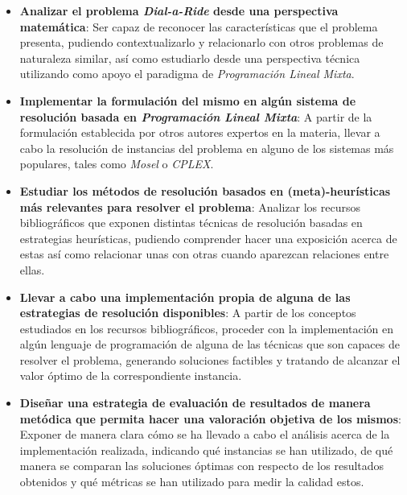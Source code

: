 \documentclass{subfiles}
\begin{document}
      \begin{itemize}

        \item \textbf{Analizar el problema \emph{Dial-a-Ride} desde una perspectiva matemática}: Ser capaz de reconocer las características que el problema presenta, pudiendo contextualizarlo y relacionarlo con otros problemas de naturaleza similar, así como estudiarlo desde una perspectiva técnica utilizando como apoyo el paradigma de \emph{Programación Lineal Mixta}.

        \item \textbf{Implementar la formulación del mismo en algún sistema de resolución basada en \emph{Programación Lineal Mixta}}: A partir de la formulación establecida por otros autores expertos en la materia, llevar a cabo la resolución de instancias del problema en alguno de los sistemas más populares, tales como \emph{Mosel} o \emph{CPLEX}.

        \item \textbf{Estudiar los métodos de resolución basados en (meta)-heurísticas más relevantes para resolver el problema}: Analizar los recursos bibliográficos que exponen distintas técnicas de resolución basadas en estrategias heurísticas, pudiendo comprender hacer una exposición acerca de estas así como relacionar unas con otras cuando aparezcan relaciones entre ellas.

        \item \textbf{Llevar a cabo una implementación propia de alguna de las estrategias de resolución disponibles}: A partir de los conceptos estudiados en los recursos bibliográficos, proceder con la implementación en algún lenguaje de programación de alguna de las técnicas que son capaces de resolver el problema, generando soluciones factibles y tratando de alcanzar el valor óptimo de la correspondiente instancia.

        \item \textbf{Diseñar una estrategia de evaluación de resultados de manera metódica que permita hacer una valoración objetiva de los mismos}: Exponer de manera clara cómo se ha llevado a cabo el análisis acerca de la implementación realizada, indicando qué instancias se han utilizado, de qué manera se comparan las soluciones óptimas con respecto de los resultados obtenidos y qué métricas se han utilizado para medir la calidad estos.

      \end{itemize}
\end{document}
